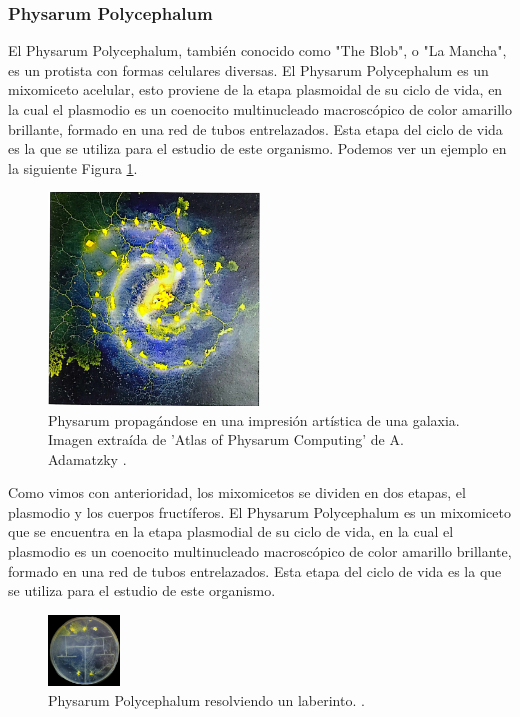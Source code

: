 \subsubsection{Physarum Polycephalum}
\label{ssub:PhysarumPolycephalum01}
    El Physarum Polycephalum, tambi\'en conocido como "The Blob", 
        o "La Mancha", es un protista con formas celulares diversas. El Physarum Polycephalum
        es un mixomiceto acelular, esto proviene de la etapa plasmoidal de su ciclo de vida,
        en la cual el plasmodio es un coenocito multinucleado macrosc\'opico de color amarillo 
        brillante, formado en una red de tubos entrelazados. Esta etapa del ciclo de vida es 
        la que se utiliza para el estudio de este organismo.\cite{Dee1960} Podemos ver un ejemplo
        en la siguiente Figura \ref{fig:PhysarumPolycephalum01}.
    \begin{figure}[h]  
        \centering
        \includegraphics[width=0.5\textwidth]{./images/marco_teorico/Physarum/PhyrasumPolycephalum01.png}
        \caption{Physarum propag\'andose en una impresi\'on art\'istica de una galaxia. Imagen extra\'ida de 'Atlas of Physarum Computing' de A. Adamatzky \cite{Adamatzky2014}.}
        \label{fig:PhysarumPolycephalum01}
    \end{figure} 
    \vskip 0.5cm
    Como vimos con anterioridad, los mixomicetos se dividen en dos etapas, el plasmodio y los cuerpos fruct\'iferos.
        El Physarum Polycephalum es un mixomiceto que se encuentra en la etapa plasmodial de su ciclo de vida, 
        en la cual el plasmodio es un coenocito multinucleado macrosc\'opico de color amarillo brillante, formado en una red de tubos entrelazados.
        Esta etapa del ciclo de vida es la que se utiliza para el estudio de este organismo.\cite{Dee1960}
    \begin{figure}
        \centering
        \includegraphics[width=0.17\textwidth]{./images/marco_teorico/Physarum/LaberintoPhysarum.png}
        \caption{Physarum Polycephalum resolviendo un laberinto. \cite{Adamatzky2014}.}
        \label{fig:PhysarumPolycephalum02}
    \end{figure}
